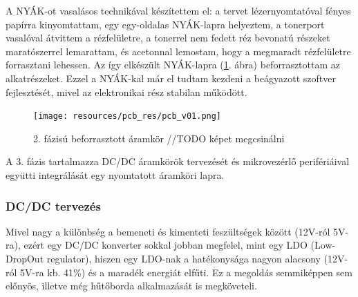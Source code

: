 \documentclass[../main.tex]{subfiles}
\begin{document}
        A NYÁK-ot vasalásos technikával készítettem el: a tervet lézernyomtatóval fényes papírra kinyomtattam, egy egy-oldalas NYÁK-lapra helyeztem, a tonerport vasalóval átvittem a rézfelületre, a tonerrel nem fedett réz bevonatú részeket maratószerrel lemarattam, és acetonnal lemostam, hogy a megmaradt rézfelületre forrasztani lehessen. Az így elkészült NYÁK-lapra (\ref{fig:pcb_v01}. ábra) beforrasztottam az alkatrészeket. Ezzel a NYÁK-kal már el tudtam kezdeni a beágyazott szoftver fejlesztését, mivel az elektronikai rész stabilan működött.
        
        \begin{figure}[h!]
            \centering
                \texttt{[image: resources/pcb\_res/pcb\_v01.png]}
            \caption{2. fázisú beforrasztott áramkör //TODO képet megcsinálni}
            \label{fig:pcb_v01}
        \end{figure}
        
        A 3. fázis tartalmazza DC/DC áramkörök tervezését és mikrovezérlő perifériáival együtti integrálását egy nyomtatott áramköri lapra.
        
        \subsubsection{DC/DC tervezés}
            Mivel nagy a különbség a bemeneti és kimenteti feszültségek között (12V-ról 5V-ra), ezért egy DC/DC konverter sokkal jobban megfelel, mint egy LDO (Low-DropOut regulator), hiszen egy LDO-nak a hatékonysága nagyon alacsony (12V-ról 5V-ra kb. 41\%) és a maradék energiát elfűti. Ez a megoldás semmiképpen sem előnyös, illetve még hűtőborda alkalmazását is megköveteli.
            
            
\end{document}

